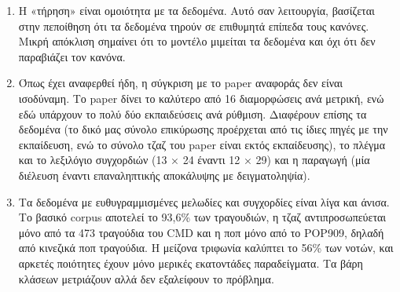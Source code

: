 \begin{enumerate}
    \item Η «τήρηση» είναι ομοιότητα με τα δεδομένα. Αυτό σαν λειτουργία, βασίζεται στην πεποίθηση ότι τα δεδομένα τηρούν σε επιθυμητά επίπεδα τους κανόνες. Μικρή απόκλιση σημαίνει ότι το μοντέλο μιμείται τα δεδομένα και όχι ότι δεν παραβιάζει τον κανόνα.
    \item Όπως έχει αναφερθεί ήδη, η σύγκριση με το paper αναφοράς δεν είναι ισοδύναμη. Το paper δίνει το καλύτερο από 16 διαμορφώσεις ανά μετρική, ενώ εδώ υπάρχουν το πολύ δύο εκπαιδεύσεις ανά ρύθμιση. Διαφέρουν επίσης τα δεδομένα (το δικό μας σύνολο επικύρωσης προέρχεται από τις ίδιες πηγές με την εκπαίδευση, ενώ το σύνολο τζαζ του paper είναι εκτός εκπαίδευσης), το πλέγμα και το λεξιλόγιο συγχορδιών (13 × 24 έναντι 12 × 29) και η παραγωγή (μία διέλευση έναντι επαναληπτικής αποκάλυψης με δειγματοληψία).
    \item Τα δεδομένα με ευθυγραμμισμένες μελωδίες και συγχορδίες είναι λίγα και άνισα. Το βασικό corpus αποτελεί το 93,6\% των τραγουδιών, η τζαζ αντιπροσωπεύεται μόνο από τα 473 τραγούδια του CMD και η ποπ μόνο από το POP909, δηλαδή από κινεζικά ποπ τραγούδια. Η μείζονα τριφωνία καλύπτει το 56\% των νοτών, και αρκετές ποιότητες έχουν μόνο μερικές εκατοντάδες παραδείγματα. Τα βάρη κλάσεων μετριάζουν αλλά δεν εξαλείφουν το πρόβλημα.
\end{enumerate}

